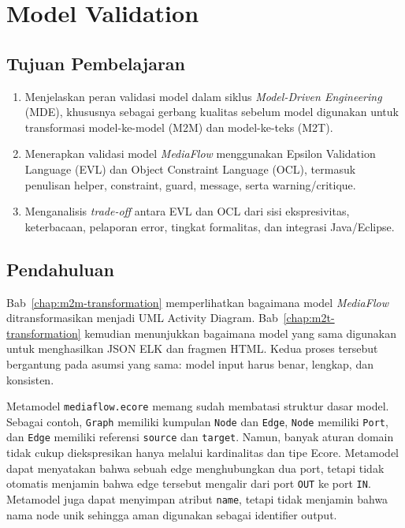 \chapter{Model Validation}
\label{chap:model-validation}

\section*{Tujuan Pembelajaran}
\begin{enumerate}
  \item Menjelaskan peran validasi model dalam siklus \textit{Model-Driven Engineering} (MDE), khususnya sebagai gerbang kualitas sebelum model digunakan untuk transformasi model-ke-model (M2M) dan model-ke-teks (M2T).
  \item Menerapkan validasi model \textit{MediaFlow} menggunakan Epsilon Validation Language (EVL) dan Object Constraint Language (OCL), termasuk penulisan helper, constraint, guard, message, serta warning/critique.
  \item Menganalisis \textit{trade-off} antara EVL dan OCL dari sisi ekspresivitas, keterbacaan, pelaporan error, tingkat formalitas, dan integrasi Java/Eclipse.
\end{enumerate}

\section{Pendahuluan}

Bab~\ref{chap:m2m-transformation} memperlihatkan bagaimana model \textit{MediaFlow} ditransformasikan menjadi UML Activity Diagram. Bab~\ref{chap:m2t-transformation} kemudian menunjukkan bagaimana model yang sama digunakan untuk menghasilkan JSON ELK dan fragmen HTML. Kedua proses tersebut bergantung pada asumsi yang sama: model input harus benar, lengkap, dan konsisten.

Metamodel \texttt{mediaflow.ecore} memang sudah membatasi struktur dasar model. Sebagai contoh, \texttt{Graph} memiliki kumpulan \texttt{Node} dan \texttt{Edge}, \texttt{Node} memiliki \texttt{Port}, dan \texttt{Edge} memiliki referensi \texttt{source} dan \texttt{target}. Namun, banyak aturan domain tidak cukup diekspresikan hanya melalui kardinalitas dan tipe Ecore. Metamodel dapat menyatakan bahwa sebuah edge menghubungkan dua port, tetapi tidak otomatis menjamin bahwa edge tersebut mengalir dari port \texttt{OUT} ke port \texttt{IN}. Metamodel juga dapat menyimpan atribut \texttt{name}, tetapi tidak menjamin bahwa nama node unik sehingga aman digunakan sebagai identifier output.

